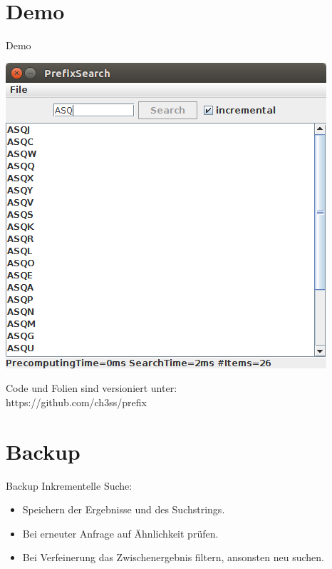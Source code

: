\documentclass[11pt, xcolor=dvipsnames]{beamer}
\begin{document}
	\section{Demo}
	\begin{frame}{Demo}
		\centering

			\includegraphics[scale=0.4]{pics/screenshot.png}

			Code und Folien sind versioniert unter:\\
			https://github.com/ch3ss/prefix
	\end{frame}
	\section{Backup}
	\begin{frame}{Backup}
		Inkrementelle Suche:
		\begin{itemize}
			\item Speichern der Ergebnisse und des Suchstrings.
			\item Bei erneuter Anfrage auf Ähnlichkeit prüfen.
			\item Bei Verfeinerung das Zwischenergebnis filtern, ansonsten neu suchen. 
		\end{itemize}
	\end{frame}
\end{document}
